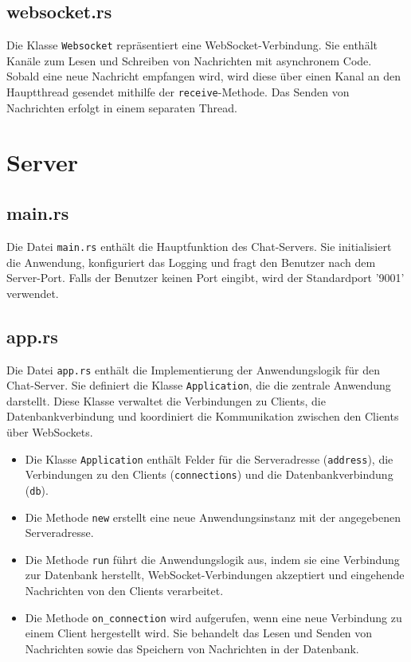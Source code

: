 \documentclass[a4paper]{article}
\begin{document}
\subsection{websocket.rs} \label{ws_client}

Die Klasse \texttt{Websocket} repräsentiert eine WebSocket-Verbindung. Sie enthält Kanäle zum Lesen und Schreiben von Nachrichten mit asynchronem Code. Sobald eine neue Nachricht empfangen wird, wird diese über einen Kanal an den Hauptthread gesendet mithilfe der \texttt{receive}-Methode. Das Senden von Nachrichten erfolgt in einem separaten Thread.


\section{Server}


\subsection{main.rs}

Die Datei \texttt{main.rs} enthält die Hauptfunktion des Chat-Servers. Sie initialisiert die Anwendung, konfiguriert das Logging und fragt den Benutzer nach dem Server-Port. Falls der Benutzer keinen Port eingibt, wird der Standardport '9001' verwendet.

\subsection{app.rs}



Die Datei \texttt{app.rs} enthält die Implementierung der Anwendungslogik für den Chat-Server. Sie definiert die Klasse \texttt{Application}, die die zentrale Anwendung darstellt. Diese Klasse verwaltet die Verbindungen zu Clients, die Datenbankverbindung und koordiniert die Kommunikation zwischen den Clients über WebSockets.

\begin{itemize}
    \item Die Klasse \texttt{Application} enthält Felder für die Serveradresse (\texttt{address}), die Verbindungen zu den Clients (\texttt{connections}) und die Datenbankverbindung (\texttt{db}).
    \item Die Methode \texttt{new} erstellt eine neue Anwendungsinstanz mit der angegebenen Serveradresse.
    \item Die Methode \texttt{run} führt die Anwendungslogik aus, indem sie eine Verbindung zur Datenbank herstellt, WebSocket-Verbindungen akzeptiert und eingehende Nachrichten von den Clients verarbeitet.
    \item Die Methode \texttt{on\_connection} wird aufgerufen, wenn eine neue Verbindung zu einem Client hergestellt wird. Sie behandelt das Lesen und Senden von Nachrichten sowie das Speichern von Nachrichten in der Datenbank.
\end{itemize}
\end{document}
